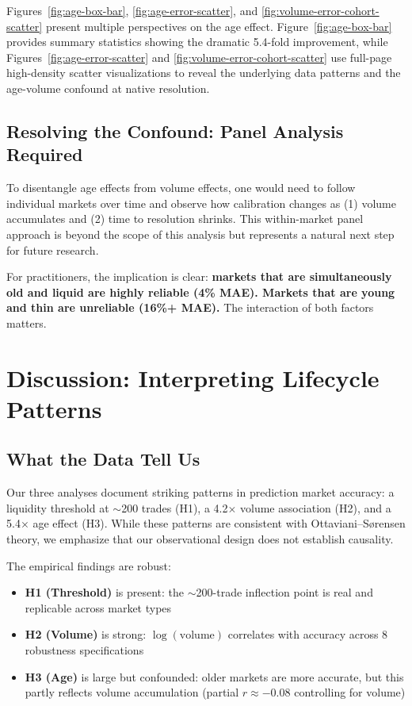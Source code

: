 \documentclass[12pt,letterpaper]{article}
\begin{document}
Figures~\ref{fig:age-box-bar}, \ref{fig:age-error-scatter}, and \ref{fig:volume-error-cohort-scatter} present multiple perspectives on the age effect. Figure~\ref{fig:age-box-bar} provides summary statistics showing the dramatic 5.4-fold improvement, while Figures~\ref{fig:age-error-scatter} and \ref{fig:volume-error-cohort-scatter} use full-page high-density scatter visualizations to reveal the underlying data patterns and the age-volume confound at native resolution.

\subsection{Resolving the Confound: Panel Analysis Required}

To disentangle age effects from volume effects, one would need to follow individual markets over time and observe how calibration changes as (1) volume accumulates and (2) time to resolution shrinks. This within-market panel approach is beyond the scope of this analysis but represents a natural next step for future research.

For practitioners, the implication is clear: \textbf{markets that are simultaneously old and liquid are highly reliable (4\% MAE). Markets that are young and thin are unreliable (16\%+ MAE).} The interaction of both factors matters.

\clearpage
\section{Discussion: Interpreting Lifecycle Patterns}\label{sec:discussion}

\subsection{What the Data Tell Us}

Our three analyses document striking patterns in prediction market accuracy: a liquidity threshold at $\sim$200 trades (H1), a 4.2$\times$ volume association (H2), and a 5.4$\times$ age effect (H3). While these patterns are consistent with Ottaviani--S{\o}rensen theory, we emphasize that our observational design does not establish causality.

The empirical findings are robust:
\begin{itemize}
    \item \textbf{H1 (Threshold)} is present: the $\sim$200-trade inflection point is real and replicable across market types
    \item \textbf{H2 (Volume)} is strong: $\log(\text{volume})$ correlates with accuracy across 8 robustness specifications
    \item \textbf{H3 (Age)} is large but confounded: older markets are more accurate, but this partly reflects volume accumulation (partial $r \approx -0.08$ controlling for volume)
\end{itemize}
\end{document}
